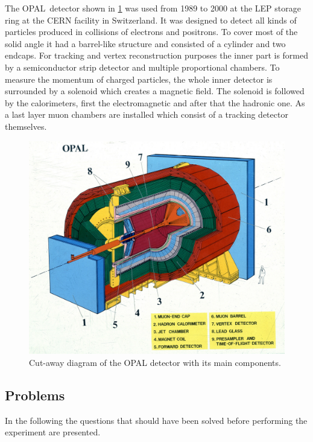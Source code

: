 \documentclass[11pt, a4paper]{article}
\numberwithin{equation}{section}
\begin{document}
The OPAL~detector shown in \ref{fig:opal} was used from 1989 to 2000 at the LEP storage ring at the CERN facility in Switzerland.
It was designed to detect all kinds of particles produced in collisions of electrons and positrons.
To cover most of the solid angle it had a barrel-like structure and consisted of a cylinder and two endcaps.
For tracking and vertex reconstruction purposes the inner part is formed by a semiconductor strip detector and multiple proportional chambers.
To measure the momentum of charged particles, the whole inner detector is surrounded by a solenoid which creates a magnetic field.
The solenoid is followed by the calorimeters, first the electromagnetic and after that the hadronic one.
As a last layer muon chambers are installed which consist of a tracking detector themselves.
\begin{figure}[h]
	\centering
	\includegraphics[width=.8\textwidth]{./figures/theory/opal}
	\caption{Cut-away diagram of the OPAL detector with its main components\protect\footnotemark.}
	\label{fig:opal}
\end{figure}

\subsection{Problems}
In the following the questions that should have been solved before performing the experiment are presented.
\label{sec:problems}
\end{document}
